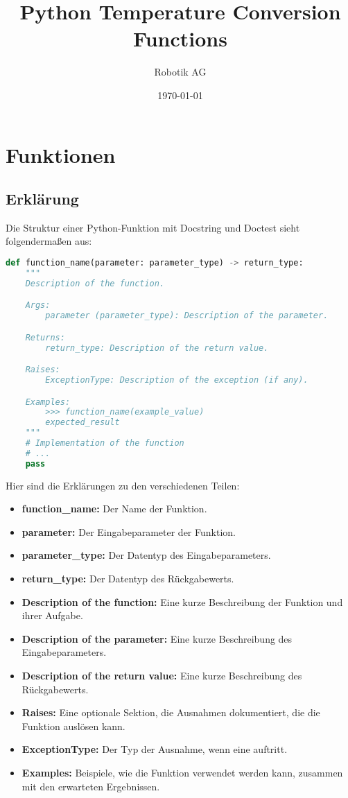 \documentclass{article}
\begin{document}
\title{Python Temperature Conversion Functions}
\author{Robotik AG}
\date{\today}
\maketitle

\section*{Funktionen}

\subsection*{Erklärung}

Die Struktur einer Python-Funktion mit Docstring und Doctest sieht folgendermaßen aus:

\begin{lstlisting}[language=Python]
def function_name(parameter: parameter_type) -> return_type:
    """
    Description of the function.

    Args:
        parameter (parameter_type): Description of the parameter.

    Returns:
        return_type: Description of the return value.

    Raises:
        ExceptionType: Description of the exception (if any).

    Examples:
        >>> function_name(example_value)
        expected_result
    """
    # Implementation of the function
    # ...
    pass
\end{lstlisting}

Hier sind die Erklärungen zu den verschiedenen Teilen:

\begin{itemize}
    \item \textbf{function\_name:} Der Name der Funktion.
    \item \textbf{parameter:} Der Eingabeparameter der Funktion.
    \item \textbf{parameter\_type:} Der Datentyp des Eingabeparameters.
    \item \textbf{return\_type:} Der Datentyp des Rückgabewerts.
    \item \textbf{Description of the function:} Eine kurze Beschreibung der Funktion und ihrer Aufgabe.
    \item \textbf{Description of the parameter:} Eine kurze Beschreibung des Eingabeparameters.
    \item \textbf{Description of the return value:} Eine kurze Beschreibung des Rückgabewerts.
    \item \textbf{Raises:} Eine optionale Sektion, die Ausnahmen dokumentiert, die die Funktion auslösen kann.
    \item \textbf{ExceptionType:} Der Typ der Ausnahme, wenn eine auftritt.
    \item \textbf{Examples:} Beispiele, wie die Funktion verwendet werden kann, zusammen mit den erwarteten Ergebnissen.
\end{itemize}
\end{document}

